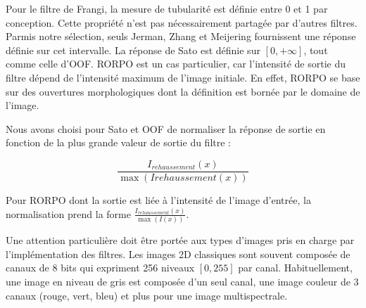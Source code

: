 Pour le filtre de Frangi, la mesure de tubularité est définie entre 0 et 1 par conception. Cette propriété n'est pas nécessairement partagée par d'autres filtres. Parmis notre sélection, seuls Jerman, Zhang et Meijering fournissent une réponse définie sur cet intervalle. La réponse de Sato est définie sur $[0,+\infty]$, tout comme celle d'OOF. RORPO est un cas particulier, car l'intensité de sortie du filtre dépend de l'intensité maximum de l'image initiale. En effet, RORPO se base sur des ouvertures morphologiques dont la définition est bornée par le domaine de l'image. 


Nous avons choisi pour Sato et OOF de normaliser la réponse de sortie en fonction de la plus grande valeur de sortie du filtre :

\begin{equation}
  \frac{I_{rehaussement}(x)} {\max(I{rehaussement}(x))}
\end{equation}

Pour RORPO dont la sortie est liée à l'intensité de l'image d'entrée, la normalisation prend la forme $ \frac{I_{rehaussement}(x)} {\max(I(x))} $.


Une attention particulière doit être portée aux types d'images pris en charge par l'implémentation des filtres. Les images 2D classiques sont souvent composée de canaux de 8 bits qui expriment 256 niveaux $[0,255]$ par canal. Habituellement, une image en niveau de gris est composée d'un seul canal, une image couleur de 3 canaux (rouge, vert, bleu) et plus pour une image multispectrale. 

